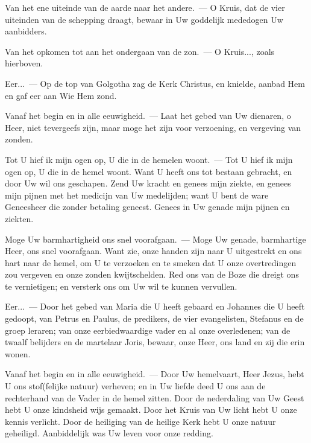 \documentclass[12pt,twoside,a5paper]{article}
\begin{document}
\begin{halfparskip}
   Van het ene uiteinde van de aarde naar het andere.~--- O Kruis, dat de vier uiteinden van de schepping draagt, bewaar in Uw goddelijk mededogen Uw aanbidders.

  Van het opkomen tot aan het ondergaan van de zon.~--- O Kruis..., zoals hierboven.

  Eer...~--- Op de top van Golgotha zag de Kerk Christus, en knielde, aanbad Hem en gaf eer aan Wie Hem zond.

  Vanaf het begin en in alle eeuwigheid.~--- Laat het gebed van Uw dienaren, o Heer, niet tevergeefs zijn, maar moge het zijn voor verzoening, en vergeving van zonden.
\end{halfparskip}

\begin{halfparskip}
   Tot U hief ik mijn ogen op, U die in de hemelen woont.~--- Tot U hief ik mijn ogen op, U die in de hemel woont. Want U heeft ons tot bestaan gebracht, en door Uw wil ons geschapen. Zend Uw kracht en genees mijn ziekte, en genees mijn pijnen met het medicijn van Uw medelijden; want U bent de ware Geneesheer die zonder betaling geneest. Genees in Uw genade mijn pijnen en ziekten.

  Moge Uw barmhartigheid ons snel voorafgaan.~--- Moge Uw genade, barmhartige Heer, ons snel voorafgaan. Want zie, onze handen zijn naar U uitgestrekt en ons hart naar de hemel, om U te verzoeken en te smeken dat U onze overtredingen zou vergeven en onze zonden kwijtschelden. Red ons van de Boze die dreigt ons te vernietigen; en versterk ons om Uw wil te kunnen vervullen.

  Eer...~--- Door het gebed van Maria die U heeft gebaard en Johannes die U heeft gedoopt, van Petrus en Paulus, de predikers, de vier evangelisten, Stefanus en de groep leraren; van onze eerbiedwaardige vader en al onze overledenen; van de twaalf belijders en de martelaar Joris, bewaar, onze Heer, ons land en zij die erin wonen.

  Vanaf het begin en in alle eeuwigheid.~--- Door Uw hemelvaart, Heer Jezus, hebt U ons stof(felijke natuur) verheven; en in Uw liefde deed U ons aan de rechterhand van de Vader in de hemel zitten. Door de nederdaling van Uw Geest hebt U onze kindsheid wijs gemaakt. Door het Kruis van Uw licht hebt U onze kennis verlicht. Door de heiliging van de heilige Kerk hebt U onze natuur geheiligd. Aanbiddelijk was Uw leven voor onze
  redding.
\end{halfparskip}
\end{document}
